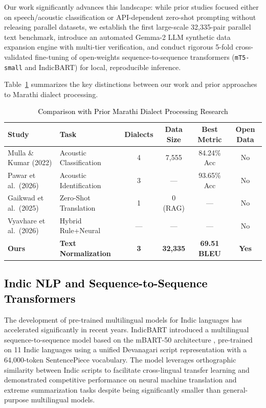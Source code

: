 Our work significantly advances this landscape: while prior studies focused either on speech/acoustic classification or API-dependent zero-shot prompting without releasing parallel datasets, we establish the first large-scale 32,335-pair parallel text benchmark, introduce an automated Gemma-2 LLM synthetic data expansion engine with multi-tier verification, and conduct rigorous 5-fold cross-validated fine-tuning of open-weights sequence-to-sequence transformers (\texttt{mT5-small} and IndicBART) for local, reproducible inference.


Table~\ref{tab:related_comparison} summarizes the key distinctions between our work and prior approaches to Marathi dialect processing.

\begin{table}[t]
\color{black}
\centering
\caption{\textcolor{black}{Comparison with Prior Marathi Dialect Processing Research}}
\label{tab:related_comparison}
\begin{tabularx}{\textwidth}{lXcccc}
\hline
\textbf{Study} & \textbf{Task} & \textbf{Dialects} & \textbf{Data Size} & \textbf{Best Metric} & \textbf{Open Data} \\
\hline
Mulla \& Kumar (2022) & Acoustic Classification & 4 & 7,555 & 84.24\% Acc & No \\
Pawar et al.\ (2026) & Acoustic Identification & 3 & --- & 93.65\% Acc & No \\
Gaikwad et al.\ (2025) & Zero-Shot Translation & 1 & 0 (RAG) & --- & No \\
Vyavhare et al.\ (2026) & Hybrid Rule+Neural & --- & --- & --- & No \\
\hline
\textbf{Ours} & \textbf{Text Normalization} & \textbf{3} & \textbf{32,335} & \textbf{69.51 BLEU} & \textbf{Yes} \\
\hline
\end{tabularx}
\end{table}

\subsection{\textcolor{black}{Indic NLP and Sequence-to-Sequence Transformers}}

The development of pre-trained multilingual models for Indic languages has accelerated significantly in recent years. IndicBART \cite{dabre2022indicbart} introduced a multilingual sequence-to-sequence model based on the mBART-50 architecture \cite{lewis2020bart}, pre-trained on 11 Indic languages using a unified Devanagari script representation with a 64,000-token SentencePiece vocabulary. The model leverages orthographic similarity between Indic scripts to facilitate cross-lingual transfer learning and demonstrated competitive performance on neural machine translation and extreme summarization tasks despite being significantly smaller than general-purpose multilingual models.



